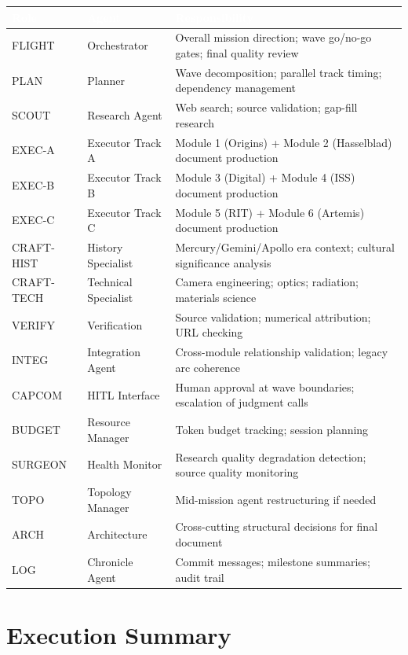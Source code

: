 \documentclass[11pt,letterpaper]{article}
\newcommand{\tableheader}[1]{\textbf{\sffamily\textcolor{white}{#1}}}
\begin{document}
\begin{center}
\begin{tabularx}{\textwidth}{L{2.5cm}L{3cm}X}
\toprule
{}
\tableheader{Role} & \tableheader{Agent} & \tableheader{Responsibility} \\
\midrule
FLIGHT & Orchestrator & Overall mission direction; wave go/no-go gates; final quality review \\
PLAN & Planner & Wave decomposition; parallel track timing; dependency management \\
SCOUT & Research Agent & Web search; source validation; gap-fill research \\
EXEC-A & Executor Track A & Module 1 (Origins) + Module 2 (Hasselblad) document production \\
EXEC-B & Executor Track B & Module 3 (Digital) + Module 4 (ISS) document production \\
EXEC-C & Executor Track C & Module 5 (RIT) + Module 6 (Artemis) document production \\
CRAFT-HIST & History Specialist & Mercury/Gemini/Apollo era context; cultural significance analysis \\
CRAFT-TECH & Technical Specialist & Camera engineering; optics; radiation; materials science \\
VERIFY & Verification & Source validation; numerical attribution; URL checking \\
INTEG & Integration Agent & Cross-module relationship validation; legacy arc coherence \\
CAPCOM & HITL Interface & Human approval at wave boundaries; escalation of judgment calls \\
BUDGET & Resource Manager & Token budget tracking; session planning \\
SURGEON & Health Monitor & Research quality degradation detection; source quality monitoring \\
TOPO & Topology Manager & Mid-mission agent restructuring if needed \\
ARCH & Architecture & Cross-cutting structural decisions for final document \\
LOG & Chronicle Agent & Commit messages; milestone summaries; audit trail \\
\bottomrule
\end{tabularx}
\end{center}

\section{Execution Summary}
\end{document}
